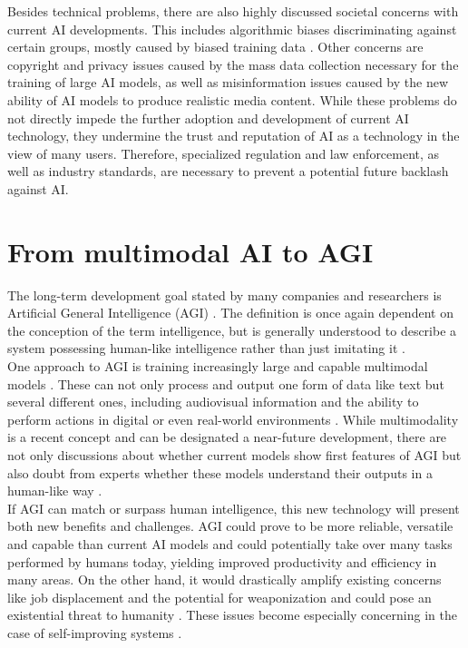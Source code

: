 \documentclass[a4paper, conference]{IEEEtran}
\begin{document}
Besides technical problems, there are also highly discussed societal concerns with current AI developments. This includes algorithmic biases discriminating against certain groups, mostly caused by biased training data \cite[pp. 1812-1818]{aiModernApproach}. Other concerns are copyright \cite{genAiCopyright} and privacy issues \cite[pp. 1807-1812]{aiModernApproach} caused by the mass data collection necessary for the training of large AI models, as well as misinformation issues \cite[p. 55]{littman2022gathering} caused by the new ability of AI models to produce realistic media content. While these problems do not directly impede the further adoption and development of current AI technology, they undermine the trust and reputation of AI as a technology in the view of many users. Therefore, specialized regulation and law enforcement, as well as industry standards, are necessary to prevent a potential future backlash against AI.\\

\section{From multimodal AI to AGI}
The long-term development goal stated by many companies and researchers is Artificial General Intelligence (AGI) \cite{openAiAgi, googleDeepMindAgi}. The definition is once again dependent on the conception of the term intelligence, but is generally understood to describe a system possessing human-like intelligence rather than just imitating it \cite[pp. 88-89]{aiModernApproach}.\\

One approach to AGI is training increasingly large and capable multimodal models \cite{Fei2022}. These can not only process and output one form of data like text but several different ones, including audiovisual information and the ability to perform actions in digital or even real-world environments \cite{baltrušaitis2017multimodal}. While multimodality is a recent concept and can be designated a near-future development, there are not only discussions about whether current models show first features of AGI \cite[pp. 92-95]{bubeck2023sparks} but also doubt from experts whether these models understand their outputs in a human-like way \cite{mahowald2024dissociating}.\\

If AGI can match or surpass human intelligence, this new technology will present both new benefits and challenges. AGI could prove to be more reliable, versatile and capable than current AI models and could potentially take over many tasks performed by humans today, yielding improved productivity and efficiency in many areas. On the other hand, it would drastically amplify existing concerns like job displacement \cite[p. 1821-1826]{aiModernApproach} and the potential for weaponization \cite[1803-1807]{aiModernApproach} and could pose an existential threat to humanity \cite{Turchin2020-TURCOG-2}. These issues become especially concerning in the case of self-improving systems \cite[pp. 1832-1833]{aiModernApproach}.\\
\end{document}
